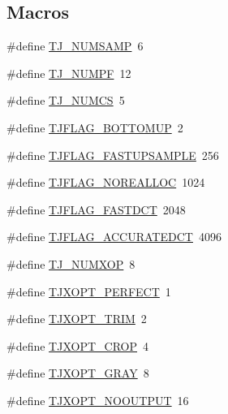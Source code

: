 \subsection*{Macros}
\begin{DoxyCompactItemize}
\item 
\#define \hyperlink{group___turbo_j_p_e_g_ga5ef3d169162ce77ce348e292a0b7477c}{T\+J\+\_\+\+N\+U\+M\+S\+A\+MP}~6
\item 
\#define \hyperlink{group___turbo_j_p_e_g_ga7010a4402f54a45ba822ad8675a4655e}{T\+J\+\_\+\+N\+U\+M\+PF}~12
\item 
\#define \hyperlink{group___turbo_j_p_e_g_ga39f57a6fb02d9cf32e7b6890099b5a71}{T\+J\+\_\+\+N\+U\+M\+CS}~5
\item 
\#define \hyperlink{group___turbo_j_p_e_g_ga72ecf4ebe6eb702d3c6f5ca27455e1ec}{T\+J\+F\+L\+A\+G\+\_\+\+B\+O\+T\+T\+O\+M\+UP}~2
\item 
\#define \hyperlink{group___turbo_j_p_e_g_ga4ee4506c81177a06f77e2504a22efd2d}{T\+J\+F\+L\+A\+G\+\_\+\+F\+A\+S\+T\+U\+P\+S\+A\+M\+P\+LE}~256
\item 
\#define \hyperlink{group___turbo_j_p_e_g_ga8808d403c68b62aaa58a4c1e58e98963}{T\+J\+F\+L\+A\+G\+\_\+\+N\+O\+R\+E\+A\+L\+L\+OC}~1024
\item 
\#define \hyperlink{group___turbo_j_p_e_g_gaabce235db80d3f698b27f36cbd453da2}{T\+J\+F\+L\+A\+G\+\_\+\+F\+A\+S\+T\+D\+CT}~2048
\item 
\#define \hyperlink{group___turbo_j_p_e_g_gacb233cfd722d66d1ccbf48a7de81f0e0}{T\+J\+F\+L\+A\+G\+\_\+\+A\+C\+C\+U\+R\+A\+T\+E\+D\+CT}~4096
\item 
\#define \hyperlink{group___turbo_j_p_e_g_ga0f6dbd18adf38b7d46ac547f0f4d562c}{T\+J\+\_\+\+N\+U\+M\+X\+OP}~8
\item 
\#define \hyperlink{group___turbo_j_p_e_g_ga50e03cb5ed115330e212417429600b00}{T\+J\+X\+O\+P\+T\+\_\+\+P\+E\+R\+F\+E\+CT}~1
\item 
\#define \hyperlink{group___turbo_j_p_e_g_ga319826b7eb1583c0595bbe7b95428709}{T\+J\+X\+O\+P\+T\+\_\+\+T\+R\+IM}~2
\item 
\#define \hyperlink{group___turbo_j_p_e_g_ga9c771a757fc1294add611906b89ab2d2}{T\+J\+X\+O\+P\+T\+\_\+\+C\+R\+OP}~4
\item 
\#define \hyperlink{group___turbo_j_p_e_g_ga3acee7b48ade1b99e5588736007c2589}{T\+J\+X\+O\+P\+T\+\_\+\+G\+R\+AY}~8
\item 
\#define \hyperlink{group___turbo_j_p_e_g_gafbf992bbf6e006705886333703ffab31}{T\+J\+X\+O\+P\+T\+\_\+\+N\+O\+O\+U\+T\+P\+UT}~16
\item 

\end{DoxyCompactItemize}
